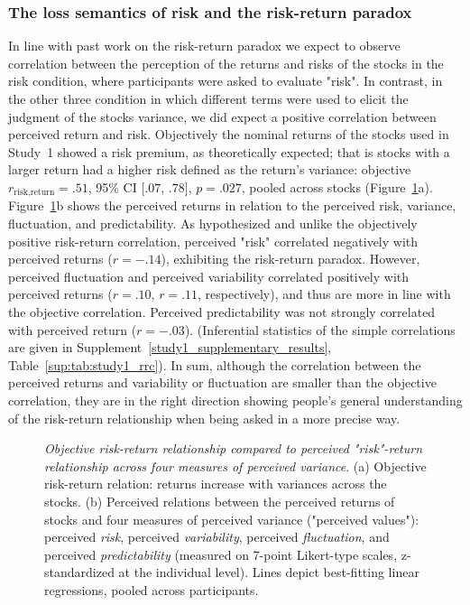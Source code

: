 \documentclass[a4paper,man, natbib,floatsintext]{apa6} %
\begin{document}


\subsubsection{The loss semantics of risk and the risk-return paradox}
In line with past work on the risk-return paradox we expect to observe  correlation between the perception of the returns and risks of the stocks in the risk condition, where participants were asked to evaluate "risk". In contrast, in the other three condition in which different terms were used to elicit the judgment of the stocks variance, we did expect a positive correlation between perceived return and risk. Objectively the nominal returns of the stocks used in Study~1 showed a risk premium, as theoretically expected; that is stocks with a larger return had a higher risk defined as the return's variance: objective $r_{\text{risk,return}} = .51$, 95\% CI $[.07$, $.78]$, $p = .027$, pooled across stocks (Figure~\ref{fig:rrc}a). Figure~\ref{fig:rrc}b shows the perceived returns in relation to the perceived risk, variance, fluctuation, and predictability. As hypothesized and unlike the objectively positive risk-return correlation, perceived "risk" correlated negatively with perceived returns ($r = -.14$), exhibiting the risk-return paradox. However, perceived fluctuation and perceived variability correlated positively with perceived returns ($r = .10$, $r = .11$, respectively), and thus are more in line with the objective correlation. Perceived predictability was not strongly correlated with perceived return ($r = -.03$). (Inferential statistics of the simple correlations are given in Supplement~\ref{study1_supplementary_results}, Table~\ref{sup:tab:study1_rrc}). In sum, although the correlation between the perceived returns and variability or fluctuation are smaller than the objective correlation, they are in the right direction showing people's general understanding of the risk-return relationship when being asked in a more precise way. 
%
\begin{figure}[!htbp] 
 \centering
  \caption{\textit{Objective risk-return relationship compared to perceived "risk"-return relationship across four measures of perceived variance}. (a) Objective risk-return relation: returns increase with variances across the stocks. (b) Perceived relations between the perceived returns of stocks and four measures of perceived variance ("perceived values"): perceived \textit{risk}, perceived \textit{variability}, perceived \textit{fluctuation}, and perceived \textit{predictability} (measured on 7-point Likert-type scales, z-standardized at the individual level). Lines depict best-fitting linear regressions, pooled across participants.}
  \label{fig:rrc}
\end{figure}
\end{document}
